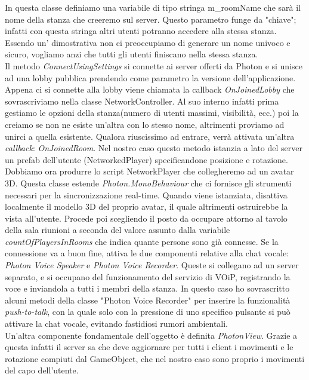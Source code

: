 In questa classe definiamo una variabile di tipo stringa m\_roomName che sarà il nome della stanza che creeremo sul server. Questo parametro funge da "chiave"; infatti con questa stringa altri utenti potranno accedere alla stessa stanza. Essendo un' dimostrativa non ci preoccupiamo di generare un nome univoco e sicuro, vogliamo anzi che tutti gli utenti finiscano nella stessa stanza. \\
Il metodo \textit{ConnectUsingSettings} si connette ai server offerti da Photon e si unisce ad una lobby pubblica prendendo come parametro la versione dell'applicazione. Appena ci si connette alla lobby viene chiamata la callback \textit{OnJoinedLobby} che sovrascriviamo nella classe NetworkController. Al suo interno infatti prima gestiamo le opzioni della stanza(numero di utenti massimi, visibilità, ecc.) poi la creiamo se non ne esiste un'altra con lo stesso nome, altrimenti proviamo ad unirci a quella esistente. Qualora riuscissimo ad entrare, verrà attivata un'altra \textit{callback}: \textit{OnJoinedRoom}. Nel nostro caso questo metodo istanzia a lato del server un prefab dell'utente (NetworkedPlayer) specificandone posizione e rotazione.\\

Dobbiamo ora produrre lo script NetworkPlayer che collegheremo ad un avatar 3D. Questa classe estende \textit{Photon.MonoBehaviour} che ci fornisce gli strumenti necessari per la sincronizzazione real-time. Quando viene istanziata, disattiva localmente il modello 3D del proprio avatar, il quale altrimenti ostruirebbe la vista all'utente. Procede poi scegliendo il posto da occupare attorno al tavolo della sala riunioni a seconda del valore assunto dalla variabile \textit{countOfPlayersInRooms} che indica quante persone sono già connesse. Se la connessione va a buon fine, attiva le due componenti relative alla chat vocale: \textit{Photon Voice Speaker} e \textit{Photon Voice Recorder}. Queste si collegano ad un server separato, e si occupano del funzionamento del servizio di VOiP, registrando la voce e inviandola a tutti i membri della stanza. In questo caso ho sovrascritto alcuni metodi della classe "Photon Voice Recorder" per inserire la funzionalità \textit{push-to-talk}, con la quale solo con la pressione di uno specifico pulsante si può attivare la chat vocale, evitando fastidiosi rumori ambientali.\\
Un'altra componente fondamentale dell'oggetto è definita \textit{PhotonView}. Grazie a questa infatti il server sa che deve aggiornare per tutti i client i movimenti e le rotazione compiuti dal GameObject, che nel nostro caso sono proprio i movimenti del capo dell'utente.

